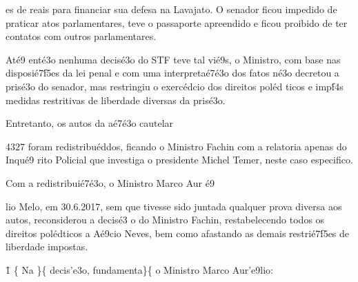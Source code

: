 {es de reais para financiar sua defesa na Lavajato.  O senador ficou impedido de praticar atos parlamentares, teve o passaporte apreendido e ficou proibido de ter contatos com outros parlamentares. 
\par At\'e9 ent\'e3o nenhuma decis\'e3o do STF teve tal vi\'e9s, o Ministro, com base nas disposi\'e7\'f5es da lei penal e com uma interpreta\'e7\'e3o dos fatos n\'e3o decretou a pris\'e3o do senador, mas restringiu o exerc\'edcio dos direitos pol\'ed
ticos e imp\'f4s medidas restritivas de liberdade diversas da pris\'e3o. 
\par Entretanto, os autos da a\'e7\'e3o cautelar}{\rtlch{}  \ltrch{}   4327}{\rtlch{}  \ltrch{}  
 foram redistribu\'eddos, ficando o Ministro Fachin com a relatoria }{\rtlch{}  \ltrch{}  apenas do Inqu\'e9
rito Policial que investiga o presidente Michel Temer, neste caso especifico. }{\rtlch{}  \ltrch{}  
\par }{\rtlch{}  \ltrch{}  Com a redistribui\'e7\'e3o, o Ministro Marco Aur}{\rtlch{}  \ltrch{}  \'e9}{
\rtlch{}  \ltrch{}  lio Melo, em 30.6.2017, sem que tivesse sido juntada qualquer prova diversa aos autos, reconsiderou a decis\'e3
o do Ministro Fachin, restabelecendo todos os direitos pol\'edticos a A\'e9cio Neves, bem como afastando as demais restri\'e7\'f5es de liberdade impostas. 
\par }\pard\plain \ltrpar{}\ql {}\widctlpar\wrapdefault\aspalpha\aspnum\fahang\adjustright{}
 \rtlch{}  \ltrch{}
\f1\cgrid{} \{
\rtlch{}  \ltrch{}
 Na
\}\{\rtlch{}  \ltrch{}
decis'e3o, fundamenta\}\{\rtlch{}  \ltrch{}
 o
Ministro Marco Aur'e9lio:
